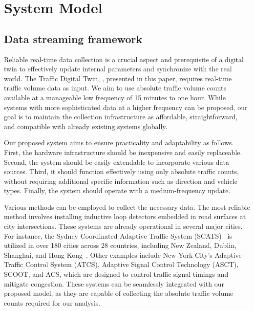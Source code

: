 \section{System Model}\label{sec:system-model}
\subsection{\textbf{Data streaming framework}}

Reliable real-time data collection is a crucial aspect and prerequisite of a digital twin to effectively update internal parameters and synchronize with the real world. The Traffic Digital Twin, \name, presented in this paper, requires real-time traffic volume data as input. We aim to use absolute traffic volume counts available at a manageable low frequency of 15 minutes to one hour. While systems with more sophisticated data at a higher frequency can be proposed, our goal is to maintain the collection infrastructure as affordable, straightforward, and compatible with already existing systems globally. 

Our proposed system aims to ensure practicality and adaptability as follows. First, the hardware infrastructure should be inexpensive and easily replaceable. Second, the system should be easily extendable to incorporate various data sources. Third, it should function effectively using only absolute traffic counts, without requiring additional specific information such as direction and vehicle types. Finally, the system should operate with a medium-frequency update.


Various methods can be employed to collect the necessary data. The most reliable method involves installing inductive loop detectors embedded in road surfaces at city intersections. These systems are already operational in several major cities. For instance, the Sydney Coordinated Adaptive Traffic System (SCATS)~\cite{scats} is utilized in over 180 cities across 28 countries, including New Zealand, Dublin, Shanghai, and Hong Kong~\cite{wiki:sydney_traffic_system}. Other examples include New York City's Adaptive Traffic Control System (ATCS), Adaptive Signal Control Technology (ASCT), SCOOT, and ACS, which are designed to control traffic signal timings and mitigate congestion. These systems can be seamlessly integrated with our proposed model, as they are capable of collecting the absolute traffic volume counts required for our analysis.

